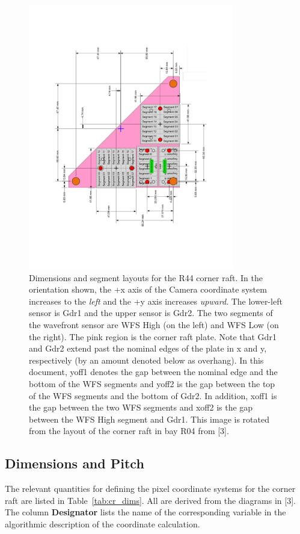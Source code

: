 \documentclass{article}[12pt]
\begin{document}
{\begin{figure}
\centering
    \includegraphics[width=0.8\textwidth]{CR_R44.pdf}
    \caption{Dimensions and segment layouts for the R44 corner raft.  In the orientation shown, the +x axis of the Camera coordinate system increases to the {\em left} and the +y axis increases {\em upward}.  The lower-left sensor is Gdr1 and the upper sensor is Gdr2.  The two segments of the wavefront sensor are WFS High (on the left) and WFS Low (on the right).  The pink region is the corner raft plate.  Note that Gdr1 and Gdr2 extend past the nominal edges of the plate in x and y, respectively (by an amount denoted below as overhang).  In this document, yoff1 denotes the gap between the nominal edge and the bottom of the WFS segments and yoff2 is the gap between the top of the WFS segments and the bottom of Gdr2.  In addition, xoff1 is the gap between the two WFS segments and xoff2 is the gap between the WFS High segment and Gdr1. This image is rotated from the layout of the corner raft in bay R04 from [3].  }
    \label{fig:CRlayout}
\end{figure}

\subsection{Dimensions and Pitch}
The relevant quantities for defining the pixel coordinate systems for the corner raft are listed in Table~\ref{tab:cr_dims}.  All are derived from the diagrams in [3].  The column {\bf Designator} lists the name of the corresponding variable in the algorithmic description of the coordinate calculation.  

}
\end{document}
